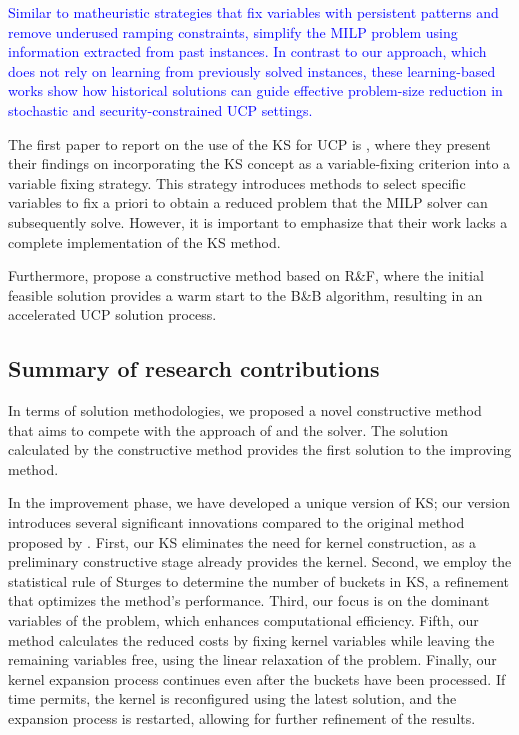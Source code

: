 \textcolor{blue}{
Similar to matheuristic strategies that fix variables with persistent patterns and remove underused ramping constraints, \citet{Liu2023, Xavier2021}  simplify the MILP problem using information extracted from past instances. In contrast to our approach, which does not rely on learning from previously solved instances, these learning-based works show how historical solutions can guide effective problem-size reduction in stochastic and security-constrained UCP settings.
}

The first paper to report on the use of the KS for UCP is \citet{Dupin2018},
where they present their findings on incorporating the KS concept as a variable-fixing criterion into a variable fixing strategy. 
This strategy introduces methods to select specific variables to fix a priori to obtain a reduced problem that the MILP solver can subsequently solve. 
However, it is important to emphasize that their work lacks a complete implementation of the KS method.

Furthermore, \citet{Harjunkoski2021} propose a constructive method based on R\&F, where the initial feasible solution provides a warm start to the B\&B algorithm, resulting in an accelerated UCP solution process. 

\subsection*{Summary of research contributions}

In terms of solution methodologies, we proposed a novel constructive method that aims to compete with the approach of \citet{Harjunkoski2021} and the solver. The solution calculated by the constructive method provides the first solution to the improving method.

In the improvement phase, we have developed a unique version of KS; our version introduces several significant innovations compared to the original method proposed by \citet{Angelelli2010}. First, our KS eliminates the need for kernel construction, as a preliminary constructive stage already provides the kernel. Second, we employ the statistical rule of Sturges to determine the number of buckets in KS, a refinement that optimizes the method's performance. Third, our focus is on the dominant variables of the problem, which enhances computational efficiency. Fifth, our method calculates the reduced costs by fixing kernel variables while leaving the remaining variables free, using the linear relaxation of the problem. Finally, our kernel expansion process continues even after the buckets have been processed. If time permits, the kernel is reconfigured using the latest solution, and the expansion process is restarted, allowing for further refinement of the results.

